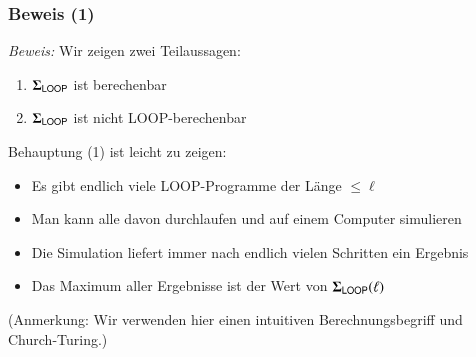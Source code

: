 \documentclass[aspectratio=1610,onlymath]{beamer}
\begin{document}
\begin{frame}[t]\frametitle{Beweis (1)}

\pause

\emph{Beweis:} Wir zeigen zwei Teilaussagen:

\begin{enumerate}[(1)]
\item $\boldsymbol{\Sigma}_{\textsf{LOOP}}$ ist berechenbar
\item $\boldsymbol{\Sigma}_{\textsf{LOOP}}$ ist nicht LOOP-berechenbar
\end{enumerate}\pause\medskip

Behauptung (1) ist leicht zu zeigen:
\begin{itemize}
\item Es gibt endlich viele LOOP-Programme der Länge $\leq \ell$
\item Man kann alle davon durchlaufen und auf einem Computer simulieren
\item Die Simulation liefert immer nach endlich vielen Schritten ein Ergebnis
\item Das Maximum aller Ergebnisse ist der Wert von $\boldsymbol{\Sigma}_{\textsf{LOOP}}(\ell)$
\end{itemize}
{\footnotesize (Anmerkung: Wir verwenden hier einen intuitiven Berechnungsbegriff und Church-Turing.)
}

\end{frame}
\end{document}
